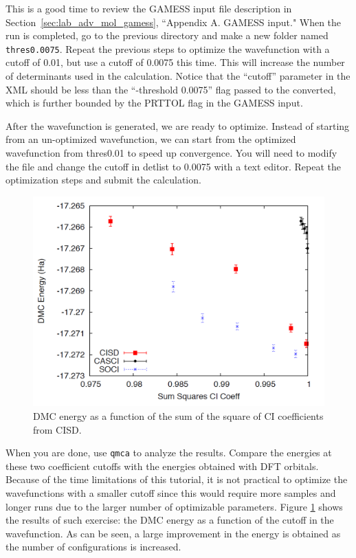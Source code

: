{This is a good time to review the GAMESS input file description in Section~\ref{sec:lab_adv_mol_gamess}, ``Appendix A. GAMESS input."
When the run is completed, go to the previous directory and make a new folder named
\texttt{thres0.0075}. Repeat the previous steps to optimize the wavefunction with a cutoff of 0.01, but use a cutoff of 0.0075 this time. This will increase the number of determinants used in the calculation. Notice that the ``cutoff'' parameter in the XML should be less than the ``-threshold 0.0075'' flag passed to the converted, which is further bounded by the PRTTOL flag in the GAMESS input.

After the wavefunction is generated, we are ready to optimize. Instead of starting from an un-optimized wavefunction, we can start from the optimized wavefunction from thres0.01 to speed up convergence. You will need to modify the file and change the cutoff in detlist to 0.0075 with a text editor. Repeat the optimization steps and submit the calculation.

\begin{figure}
\begin{center}
\includegraphics[trim = 0mm 0mm 0mm 0mm, clip,width=0.75\columnwidth]{./figures/lab_advanced_molecules_dmc_ci_cisd.png}
\end{center}
\caption{DMC energy as a function of the sum of the square of CI coefficients from CISD.}
\label{fig:lam_dmc_ci_cisd}
\end{figure}

When you are done, use \texttt{qmca} to analyze the results. Compare the energies at these two
coefficient cutoffs with the energies obtained with DFT orbitals. Because of the time limitations of this tutorial, it is not practical to optimize the wavefunctions with a smaller cutoff since this would require more samples and longer runs due to the larger number of optimizable parameters. Figure \ref{fig:lam_dmc_ci_cisd} shows the results of such exercise: the DMC energy as a function of the cutoff in the wavefunction. As can be seen, a large improvement in the energy is obtained as the number of configurations is increased.


}
